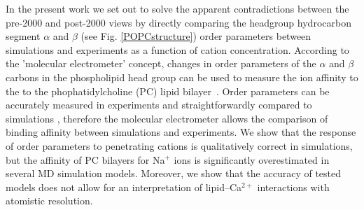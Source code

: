 \documentclass[pre,aps,floatfix,authordate1-4,twocolumn]{revtex4-1}
\begin{document}
In the present work we set out to solve the apparent contradictions
between the pre-2000 and post-2000 views
by directly comparing the headgroup hydrocarbon segment
$\alpha$ and $\beta$ (see Fig. \ref{POPCstructure}) order parameters between simulations
and experiments as a function of cation concentration. 
%
%
%
%
According to the 'molecular electrometer' concept, changes in order parameters of the $\alpha$ and $\beta$ carbons 
in the phospholipid head group can be used to measure the ion affinity to the 
to the phophatidylcholine (PC) lipid bilayer~\cite{akutsu81,altenbach84,seelig87,scherer89}.
Order parameters can be accurately measured in experiments and straightforwardly compared to 
simulations \cite{ollila16}, therefore the molecular electrometer allows the 
comparison of binding affinity between simulations and experiments. 
We show that the response of order parameters to penetrating cations 
is qualitatively correct in simulations, but the affinity of PC bilayers for Na$^{+}$ ions 
is significantly overestimated in several MD simulation models. 
Moreover, we show that the accuracy of tested models does not allow for
an interpretation of lipid--Ca$^{2+}$ interactions with atomistic resolution.
\end{document}
